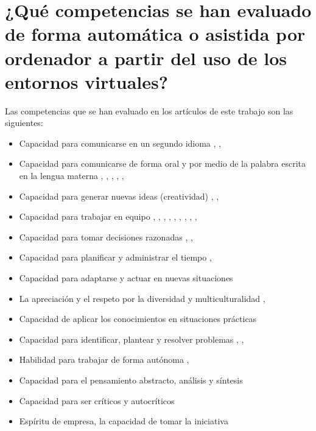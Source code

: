 
\section{¿Qué competencias se han evaluado de forma automática o asistida por ordenador a partir del uso de los entornos virtuales?}
Las competencias que se han evaluado en los artículos de este trabajo son las siguientes:
\begin{itemize}
\item Capacidad para comunicarse en un segundo idioma \cite{Shih:2011}, \cite{MercedesRico:2013}, \cite{Masip-Alvarez:2013}
\item Capacidad para comunicarse de forma oral y por medio de la palabra escrita en la lengua materna \cite{Mohamed:2008}, \cite{Piedra:2010}, \cite{Liao:2013}, \cite{Masip-Alvarez:2013}, \cite{Colomo-Palacios:2013}, \cite{Bedek:2011}
\item Capacidad para generar nuevas ideas (creatividad) \cite{Piedra:2010}, \cite{Liao:2013}, \cite{Colomo-Palacios:2013}
\item Capacidad para trabajar en equipo \cite{McMahon:2007}, \cite{Mohamed:2008}, \cite{Rashid:2008}, \cite{Lim:2011}, \cite{Liao:2013}, \cite{Masip-Alvarez:2013}, \cite{Colomo-Palacios:2013}, \cite{Gil:2011}, \cite{Palomares:2011}, \cite{Velasco:2012}	
\item Capacidad para tomar decisiones razonadas \cite{Achcaoucaou:2012}, \cite{Colomo-Palacios:2013}, \cite{Borrajo:2010}
\item Capacidad para planificar y administrar el tiempo \cite{Achcaoucaou:2012}, \cite{Liao:2013}
\item Capacidad para adaptarse y actuar en nuevas situaciones \cite{Liao:2013}
\item La apreciación y el respeto por la diversidad y multiculturalidad \cite{Liao:2013}, \cite{Colomo-Palacios:2013}
\item Capacidad de aplicar los conocimientos en situaciones prácticas \cite{Liao:2013}
\item Capacidad para identificar, plantear y resolver problemas \cite{Achcaoucaou:2012}, \cite{Guenaga:2013}, \cite{Colomo-Palacios:2013}
\item Habilidad para trabajar de forma autónoma \cite{Colomo-Palacios:2013}, \cite{Palomares:2011}
\item Capacidad para el pensamiento abstracto, análisis y síntesis \cite{Colomo-Palacios:2013}
\item Capacidad para ser críticos y autocríticos \cite{Colomo-Palacios:2013}
\item Espíritu de empresa, la capacidad de tomar la iniciativa \cite{Colomo-Palacios:2013}
\end{itemize}

